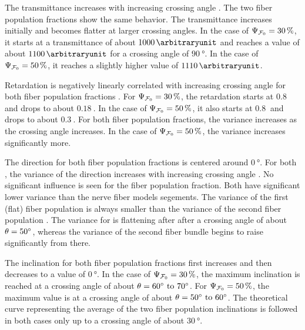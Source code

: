 \par
The transmittance increases with increasing crossing angle \modelOmega{}.
The two fiber population fractions \modelPsi{} show the same behavior.
The transmittance increases initially and becomes flatter at larger crossing angles.
In the case of $\textnormal{$\Psi_{\textnormal{$\mathcal{F}_0$}}$} = \SI{30}{\percent}$, it starts at a transmittance of about $\SI{1000}{\arbitraryunit}$ and reaches a value of about $\SI{1100}{\arbitraryunit}$ for a crossing angle of $\SI{90}{\degree}$.
In the case of $\textnormal{$\Psi_{\textnormal{$\mathcal{F}_0$}}$} = \SI{50}{\percent}$, it reaches a slightly higher value of $\SI{1110}{\arbitraryunit}$.
\par
Retardation is negatively linearly correlated with increasing crossing angle for both fiber population fractions \modelPsi{}.
For $\textnormal{$\Psi_{\textnormal{$\mathcal{F}_0$}}$}=\SI{30}{\percent}$, the retardation starts at $\SI{0.8}{}$ and drops to about $\SI{0.18}{}$.
In the case of $\textnormal{$\Psi_{\textnormal{$\mathcal{F}_0$}}$}=\SI{50}{\percent}$, it also starts at $\SI{0.8}{}$ and drops to about $\SI{0.3}{}$.
For both fiber population fractions, the variance increases as the crossing angle increases.
In the case of $\textnormal{$\Psi_{\textnormal{$\mathcal{F}_0$}}$}=\SI{50}{\percent}$, the variance increases significantly more.
\par
The direction for both fiber population fractions \modelPsi{} is centered around $\SI{0}{\degree}$.
For both \modelPsi{}, the variance of the direction increases with increasing crossing angle \modelOmega{}.
No significant influence is seen for the fiber population fraction.
Both \modelPsi{} have significant lower variance than the nerve fiber models segements.
The \bvariance{} variance of the first (flat) fiber population \popa{} is always smaller than the \bvariance{} variance of the second fiber population \popb{}.
The \bvariance{} variance for \popa{} is flattening after after a crossing angle of about $\textnormal{$\theta$} = \SI{50}{\degree}$, whereas the \bvariance{} variance of the second fiber bundle begins to raise significantly from there.
\par
The inclination for both fiber population fractions first increases and then decreases to a value of $\SI{0}{\degree}$.
In the case of $\textnormal{$\Psi_{\textnormal{$\mathcal{F}_0$}}$}=\SI{30}{\percent}$, the maximum inclination is reached at a crossing angle of about $\modelOmega=\SIrange{60}{70}{\degree}$.
For $\textnormal{$\Psi_{\textnormal{$\mathcal{F}_0$}}$}=\SI{50}{\percent}$, the maximum value is at a crossing angle of about $\modelOmega=\SIrange{50}{60}{\degree}$.
The theoretical curve representing the average of the two fiber population inclinations is followed in both cases only up to a crossing angle of about $\SI{30}{\degree}$.
